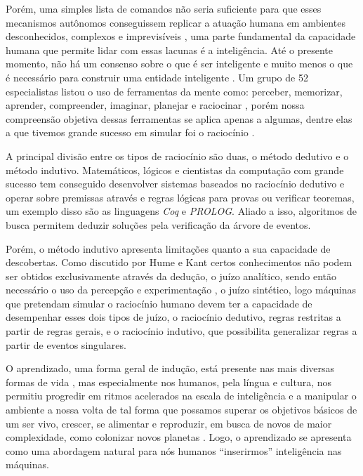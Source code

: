 Porém, uma simples lista de comandos não seria suficiente para que esses
mecanismos autônomos conseguissem replicar a atuação humana em ambientes
desconhecidos, complexos e imprevisíveis \cite{russell2016artificial}, uma
parte fundamental da capacidade humana que permite lidar com essas lacunas é a
inteligência. Até o presente momento, não há um consenso sobre o que é ser
inteligente e muito menos o que é necessário para construir uma entidade
inteligente \cite{russell2016artificial}. Um grupo de 52 especialistas listou o
uso de ferramentas da mente como: perceber, memorizar, aprender, compreender,
imaginar, planejar e raciocinar \cite{gottfredson1997mainstream}, porém nossa
compreensão objetiva dessas ferramentas se aplica apenas a algumas, dentre elas
a que tivemos grande sucesso em simular foi o raciocínio
\cite{russell2016artificial}.

A principal divisão entre os tipos de raciocínio são duas, o método dedutivo e
o método indutivo. Matemáticos, lógicos e cientistas da computação com grande
sucesso tem conseguido desenvolver sistemas baseados no raciocínio dedutivo e
operar sobre premissas através e regras lógicas para provas ou verificar
teoremas, um exemplo disso são as linguagens \textit{Coq} e \textit{PROLOG}.
Aliado a isso, algoritmos de busca permitem deduzir soluções pela verificação
da árvore de eventos.

Porém, o método indutivo apresenta limitações quanto a sua capacidade de
descobertas. Como discutido por Hume \cite{hume2000enquiry} e Kant
\cite{smith2011immanuel} certos conhecimentos não podem ser obtidos
exclusivamente através da dedução, o juízo analítico, sendo então necessário
o uso da percepção e experimentação \cite{popper2005logic}, o juízo sintético,
logo máquinas que pretendam simular o raciocínio humano devem ter a capacidade
de desempenhar esses dois tipos de juízo, o raciocínio dedutivo, regras restritas a
partir de regras gerais, e o raciocínio indutivo, que possibilita generalizar regras
a partir de eventos singulares.

O aprendizado, uma forma geral de indução, está presente nas mais diversas formas de
vida \cite{shettleworth2001animal}, mas especialmente nos humanos, pela língua e cultura,
nos permitiu progredir em ritmos acelerados na escala de inteligência e a manipular
o ambiente a nossa volta de tal forma que possamos superar os objetivos básicos de
um ser vivo, crescer, se alimentar e reproduzir, em busca de novos de maior complexidade,
como colonizar novos planetas \cite{musk2017making}. Logo, o aprendizado se
apresenta como uma abordagem natural para nós humanos ``inserirmos'' inteligência nas
máquinas.


